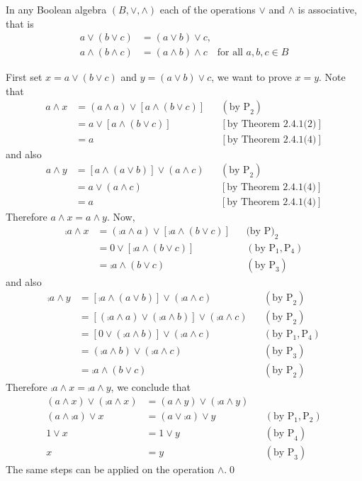 \begin{theo}
    In any Boolean algebra \((B,\vee,\wedge)\) each of the operations \(\vee\) and \(\wedge\) is associative, that is 
    \begin{align*}
        a\vee(b\vee c)&=(a\vee b)\vee c,\\
        a\wedge(b\wedge c)&=(a\wedge b)\wedge c\quad \text{for all } a,b,c\in B
    \end{align*}
\end{theo}

\begin{myproof}
    First set \(x=a\vee(b\vee c)\) and \(y=(a\vee b)\vee c\), we want to prove \(x=y\). Note that
    \begin{align*}
        a\wedge x&=(a\wedge a)\vee[a\wedge(b\vee c)] && (\text{by P}_2) \\
        &=a\vee[a\wedge(b\vee c)] && [\text{by Theorem 2.4.1(2)}] \\
        &=a && [\text{by Theorem 2.4.1(4)}]
    \end{align*}
    and also 
    \begin{align*}
        a\wedge y&=[a\wedge(a\vee b)]\vee (a\wedge c) && (\text{by P}_2) \\
        &=a\vee(a\wedge c) && [\text{by Theorem 2.4.1(4)}] \\
        &=a && [\text{by Theorem 2.4.1(4)}]
    \end{align*}
    Therefore \(a\wedge x=a\wedge y\). Now,
    \begin{align*}
        \comp{a}\wedge x&=(\comp{a}\wedge a)\vee[\comp{a}\wedge(b\vee c)] && \text{(by P)}_2 \\
        &=0\vee[\comp{a}\wedge(b\vee c)] && (\text{by }\mathrm{P}_1,\mathrm{P}_4) \\
        &=\comp{a}\wedge(b\vee c) && (\text{by P}_3)
    \end{align*}
    and also
    \begin{align*}
       \comp{a}\wedge y&=[\comp{a}\wedge(a\vee b)]\vee(\comp{a}\wedge c) && (\text{by P}_2)\\
       &=[(\comp{a}\wedge a)\vee(\comp{a}\wedge b)]\vee(\comp{a}\wedge c)&& (\text{by P}_2)  \\
       &=[0\vee(\comp{a}\wedge b)]\vee(\comp{a}\wedge c) && (\text{by }\mathrm{P}_1,\mathrm{P}_4) \\
       &=(\comp{a}\wedge b)\vee(\comp{a}\wedge c)&& (\text{by P}_3)  \\
       &=\comp{a}\wedge(b\vee c) && (\text{by P}_2)
    \end{align*}
    Therefore \(\comp{a}\wedge x=\comp{a}\wedge y\), we conclude that
    \begin{align*}
        (a\wedge x)\vee(\comp{a}\wedge x)&=(a\wedge y)\vee(\comp{a}\wedge y) &&\\
        (a\wedge\comp{a})\vee x&=(a\vee\comp{a})\vee y && (\text{by }\mathrm{P}_1,\mathrm{P}_2)\\
        1\vee x&=1\vee y && (\text{by P}_4)\\
        x&=y && (\text{by P}_3)
    \end{align*}
    The same steps can be applied on the operation \(\wedge\).\qed
\end{myproof}


